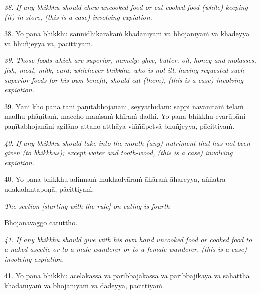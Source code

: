 \documentclass[11pt]{article}
\begin{document}
\begin{paracol}{2}
\begin{column}
{\itshape\footnotesize
38. If any bhikkhu should chew uncooked food or eat cooked food (while) keeping (it) in store, (this is a case) involving expiation.
}
\switchcolumn

\begin{flushleft}
38. Yo pana bhikkhu sannidhikārakaṁ khādanīyaṁ vā bhojanīyaṁ vā khādeyya vā bhuñjeyya vā, pācittiyaṁ.
\switchcolumn*
\end{flushleft}

{\itshape\footnotesize
39. Those foods which are superior, namely: ghee, butter, oil, honey and molasses, fish, meat, milk, curd; whichever bhikkhu, who is not ill, having requested such superior foods for his own benefit, should eat (them), (this is a case) involving expiation.
}
\switchcolumn

\begin{flushleft}
39. Yāni kho pana tāni paṇītabhojanāni, seyyathīdaṁ: sappi navanītaṁ telaṁ madhu phāṇitaṁ, maccho maṁsaṁ khīraṁ dadhi. Yo pana bhikkhu evarūpāni paṇītabhojanāni agilāno attano atthāya viññāpetvā bhuñjeyya, pācittiyaṁ.
\switchcolumn*
\end{flushleft}

{\itshape\footnotesize
40. If any bhikkhu should take into the mouth (any) nutriment that has not been given (to bhikkhus); except water and tooth-wood, (this is a case) involving expiation.
}
\switchcolumn

\begin{flushleft}
40. Yo pana bhikkhu adinnaṁ mukhadvāraṁ āhāraṁ āhareyya,
aññatra udakadantapoṇā, pācittiyaṁ.
\switchcolumn*
\end{flushleft}

{\itshape\footnotesize
The section [starting with the rule] on eating is fourth
}
\switchcolumn

\begin{flushleft}
Bhojanavaggo catuttho.
\switchcolumn*
\end{flushleft}

{\itshape\footnotesize
41. If any bhikkhu should give with his own hand uncooked food or cooked food to a naked ascetic or to a male wanderer or to a female wanderer, (this is a case) involving expiation.
}
\switchcolumn

\begin{flushleft}
41. Yo pana bhikkhu acelakassa vā paribbājakassa vā paribbājikāya vā sahatthā khādanīyaṁ vā bhojanīyaṁ vā dadeyya, pācittiyaṁ.
\switchcolumn*
\end{flushleft}


\end{column}
\end{paracol}
\end{document}
